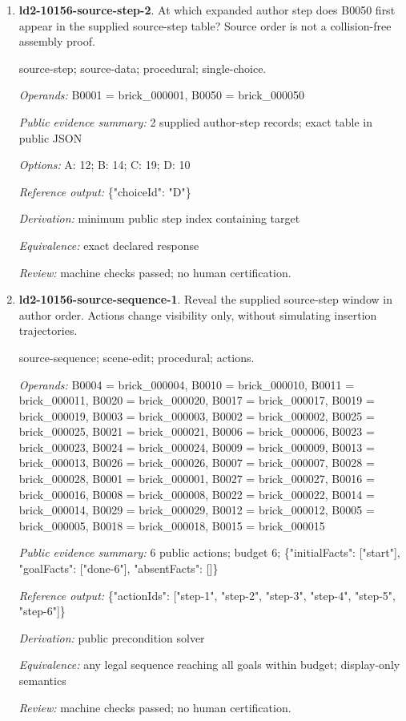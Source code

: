 \begin{enumerate}
\item \textbf{ld2-10156-source-step-2}. At which expanded author step does B0050 first appear in the supplied source-step table? Source order is not a collision-free assembly proof.
\par{\small source-step; source-data; procedural; single-choice.\par\textit{Operands:} B0001 = brick\_000001, B0050 = brick\_000050\par\textit{Public evidence summary:} 2 supplied author-step records; exact table in public JSON\par\textit{Options:} A: 12; B: 14; C: 19; D: 10\par\textit{Reference output:} \{"choiceId": "D"\}\par\textit{Derivation:} minimum public step index containing target\par\textit{Equivalence:} exact declared response\par\textit{Review:} machine checks passed; no human certification.}
\item \textbf{ld2-10156-source-sequence-1}. Reveal the supplied source-step window in author order. Actions change visibility only, without simulating insertion trajectories.
\par{\small source-sequence; scene-edit; procedural; actions.\par\textit{Operands:} B0004 = brick\_000004, B0010 = brick\_000010, B0011 = brick\_000011, B0020 = brick\_000020, B0017 = brick\_000017, B0019 = brick\_000019, B0003 = brick\_000003, B0002 = brick\_000002, B0025 = brick\_000025, B0021 = brick\_000021, B0006 = brick\_000006, B0023 = brick\_000023, B0024 = brick\_000024, B0009 = brick\_000009, B0013 = brick\_000013, B0026 = brick\_000026, B0007 = brick\_000007, B0028 = brick\_000028, B0001 = brick\_000001, B0027 = brick\_000027, B0016 = brick\_000016, B0008 = brick\_000008, B0022 = brick\_000022, B0014 = brick\_000014, B0029 = brick\_000029, B0012 = brick\_000012, B0005 = brick\_000005, B0018 = brick\_000018, B0015 = brick\_000015\par\textit{Public evidence summary:} 6 public actions; budget 6; \{"initialFacts": ["start"], "goalFacts": ["done-6"], "absentFacts": []\}\par\textit{Reference output:} \{"actionIds": ["step-1", "step-2", "step-3", "step-4", "step-5", "step-6"]\}\par\textit{Derivation:} public precondition solver\par\textit{Equivalence:} any legal sequence reaching all goals within budget; display-only semantics\par\textit{Review:} machine checks passed; no human certification.}

\end{enumerate}
